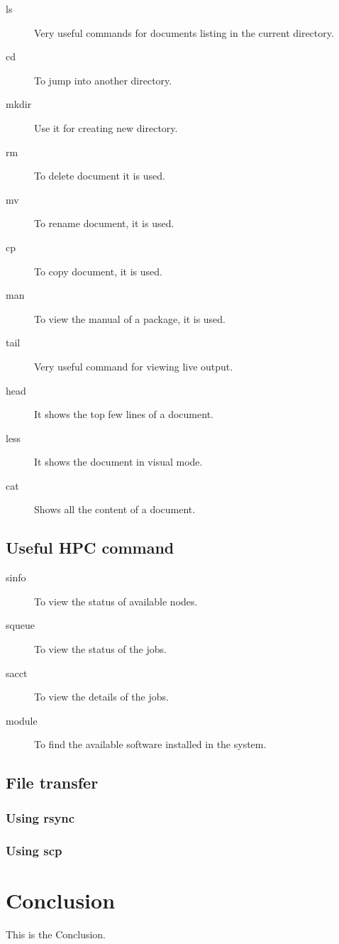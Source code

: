 \documentclass{book}
\begin{document}
\begin{description}
	\item[ls] Very useful commands for documents listing in the current directory.
	\item[cd] To jump into another directory.
	\item[mkdir] Use it for creating new directory.
	\item[rm] To delete document it is used.
	\item[mv] To rename document, it is used.
	\item[cp] To copy document, it is used.
	\item[man] To view the manual of a package, it is used.
	\item[tail] Very useful command for viewing live output.
	\item[head] It shows the top few lines of a document.
	\item[less] It shows the document in visual mode.
	\item[cat] Shows all the content of a document.

\end{description}

\section{Useful HPC command}%
\label{sec:useful_hpc_command}

\begin{description}
	\item[sinfo] To view the status of available nodes.
	\item[squeue] To view the status of the jobs.
	\item[sacct] To view the details of the jobs.
	\item[module] To find the available software installed in the system.
\end{description}

\section{File transfer}%
\label{sec:file_transfer}

\subsection{Using rsync}%
\label{sub:using_rsync}

\subsection{Using scp}%
\label{sub:using_scp}





\chapter{Conclusion}%
\label{cha:conclusion}

This is the Conclusion.
\end{document}
